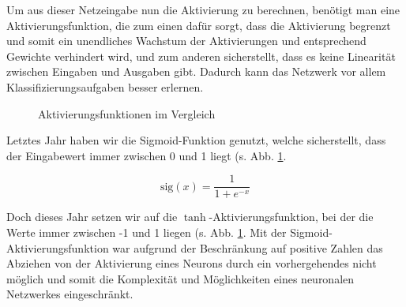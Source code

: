 \documentclass[10pt]{article}
\newcommand{\sig}{\textrm{sig}}
\begin{document}
    

Um aus dieser Netzeingabe nun die Aktivierung zu berechnen, benötigt man eine Aktivierungsfunktion, die zum einen dafür sorgt, dass die Aktivierung begrenzt und somit ein unendliches Wachstum der Aktivierungen und entsprechend Gewichte verhindert wird, und zum anderen sicherstellt, dass es keine Linearität zwischen Eingaben und Ausgaben gibt. 
Dadurch kann das Netzwerk vor allem Klassifizierungsaufgaben besser erlernen. %

\begin{figure}[h!]
    \centering
    \begin{minipage}[t]{0.5\linewidth}\vspace{0pt}%
        \caption{Aktivierungsfunktionen im Vergleich}
        \label{fig:act_funcs}
    \end{minipage}
\end{figure}

Letztes Jahr haben wir die Sigmoid-Funktion genutzt, welche sicherstellt, dass der Eingabewert immer zwischen 0 und 1 liegt (s. Abb. \ref{fig:act_funcs}.

\[
    \sig(x) = \frac{1}{1+e^{-x}}
\]

Doch dieses Jahr setzen wir auf die $\tanh$-Aktivierungsfunktion, bei der die Werte immer zwischen -1 und 1 liegen (s. Abb. \ref{fig:act_funcs}.
Mit der Sigmoid-Aktivierungsfunktion war aufgrund der Beschränkung auf positive Zahlen das Abziehen von der Aktivierung eines Neurons durch ein vorhergehendes nicht möglich und somit die Komplexität und Möglichkeiten eines neuronalen Netzwerkes eingeschränkt.
\end{document}
